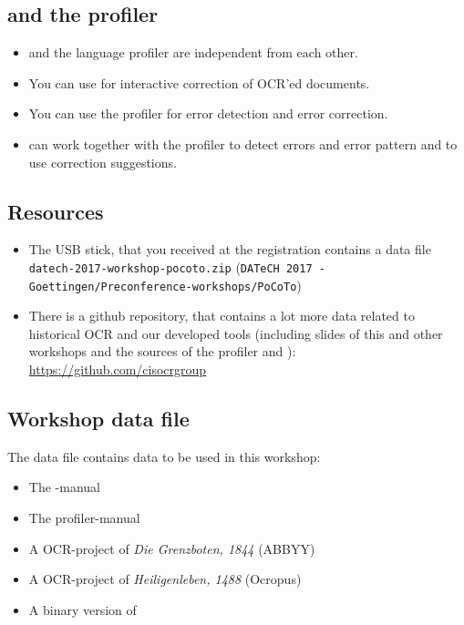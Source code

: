 \subsection{\pocoto{} and the profiler}
\begin{frame}
	\begin{itemize}
		\item \pocoto{} and the language profiler are independent from each other.
		\item You can use \pocoto{} for interactive correction of OCR'ed documents.
		\item You can use the profiler for error detection and error correction.
		\item \pocoto{} can work together with the profiler to detect errors and
			error pattern and to use correction suggestions.
	\end{itemize}
\end{frame}

\subsection{Resources}
\begin{frame}
	\begin{itemize}
		\item The USB stick, that you received at the registration contains a data
			file \texttt{datech-2017-workshop-pocoto.zip} (\texttt{DATeCH 2017 -
			Goettingen/Preconference-workshops/PoCoTo})
		\item There is a github repository, that contains a lot more data related to
			historical OCR and our developed tools (including slides of this and other
			workshops and the sources of the profiler and \pocoto{}):
			\href{https://github.com/cisocrgroup}{\url{https://github.com/cisocrgroup}}
	\end{itemize}
\end{frame}

\subsection{Workshop data file}
\begin{frame}
	The data file contains data to be used in this workshop:
	\begin{itemize}
		\item The \pocoto{}-manual
		\item The profiler-manual
		\item A OCR-project of \emph{Die Grenzboten, 1844} (ABBYY)
		\item A OCR-project of \emph{Heiligenleben, 1488} (Ocropus)
		\item A binary version of \pocoto{}
	\end{itemize}
\end{frame}

\section{}
\subsection{}
\begin{frame}
\end{frame}


